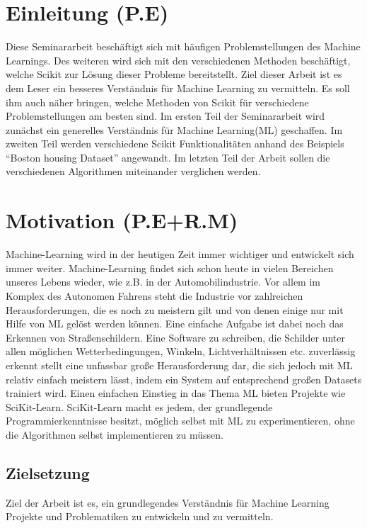 \chapter{Einleitung (P.E)}
\label{chap:einleitung}
Diese Seminararbeit beschäftigt sich mit häufigen Problemstellungen des Machine Learnings. Des weiteren wird sich mit den verschiedenen Methoden beschäftigt, welche Scikit zur Lösung dieser Probleme bereitstellt. Ziel dieser Arbeit ist es dem Leser ein besseres Verständnis für Machine Learning zu vermitteln. Es soll ihm auch näher bringen, welche Methoden von Scikit für verschiedene Problemstellungen am besten sind. Im ersten Teil der Seminararbeit wird zunächst ein generelles Verständnis für Machine Learning(ML) geschaffen. Im zweiten Teil werden verschiedene Scikit Funktionalitäten anhand des Beispiels “Boston housing Dataset” angewandt. Im letzten Teil der Arbeit sollen die verschiedenen Algorithmen miteinander verglichen werden.

\chapter{Motivation (P.E+R.M)}
\label{sec:motivation}
Machine-Learning wird in der heutigen Zeit immer wichtiger und entwickelt sich immer weiter.\cite{MB} Machine-Learning findet sich schon heute in vielen Bereichen unseres Lebens wieder, wie z.B. in der Automobilindustrie\cite{DAIM}. Vor allem im Komplex des Autonomen Fahrens steht die Industrie vor zahlreichen Herausforderungen, die es noch zu meistern gilt und von denen einige nur mit Hilfe von ML gelöst werden können. Eine einfache Aufgabe ist dabei noch das Erkennen von Straßenschildern. Eine Software zu schreiben, die Schilder unter allen möglichen Wetterbedingungen, Winkeln, Lichtverhältnissen etc. zuverlässig erkennt stellt eine unfassbar große Herausforderung dar, die sich jedoch mit ML relativ einfach meistern lässt, indem ein System auf entsprechend großen Datasets trainiert wird. 
Einen einfachen Einstieg in das Thema ML bieten Projekte wie SciKit-Learn. SciKit-Learn macht es jedem, der grundlegende Programmierkenntnisse besitzt, möglich selbst mit ML zu experimentieren, ohne die Algorithmen selbst implementieren zu müssen.



\section{Zielsetzung}
\label{sec:zielsetzung}
Ziel der Arbeit ist es, ein grundlegendes Verständnis für Machine Learning Projekte und Problematiken zu entwickeln und zu vermitteln.
